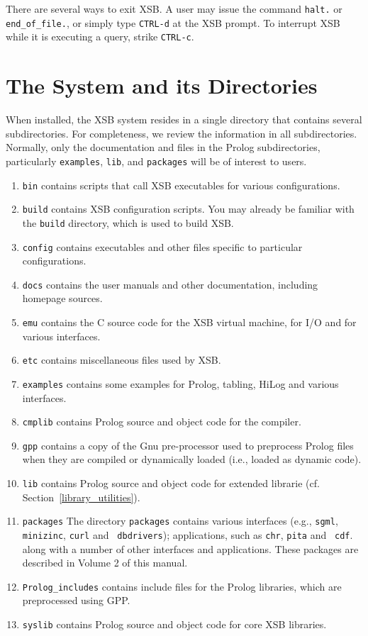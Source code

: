 There are several ways to exit XSB.  A user may issue the
command \verb'halt.' or \verb'end_of_file.', or simply type
\verb'CTRL-d' at the XSB prompt.  To interrupt XSB
while it is executing a query, strike \verb'CTRL-c'.

\section{The System and its Directories}
When installed, the XSB system resides in a single directory that
contains several subdirectories.  For completeness, we review the
information in all subdirectories.  Normally, only the documentation
and files in the Prolog subdirectories, particularly {\tt examples},
{\tt lib}, and {\tt packages} will be of interest to users.
\begin{enumerate}
\item {\tt bin} contains scripts that call XSB executables
for various configurations.
%
\item {\tt build} contains XSB configuration scripts.  You may
already be familiar with the {\tt build} directory, which is used to
build XSB.
%
\item {\tt config} contains executables and other files specific to
particular configurations.
%
\item {\tt docs} contains the user manuals and other documentation,
including homepage sources.  
%
\item {\tt emu} contains the C source code for the XSB virtual
  machine, for I/O and for various interfaces.
%
\item {\tt etc} contains miscellaneous files used by XSB.
%
\item {\tt examples} contains some examples for Prolog, tabling,
HiLog and various interfaces.
%
\item {\tt cmplib} contains Prolog source and object code for the
compiler. 
%
\item {\tt gpp} contains a copy of the Gnu pre-processor used to
  preprocess Prolog files when they are compiled or dynamically
  loaded (i.e., loaded as dynamic code).
%
\item {\tt lib} contains Prolog source and object code for extended
librarie (cf. Section~\ref{library_utilities}). 
%
\item {\tt packages} The directory {\tt packages} contains various
  interfaces (e.g., {\tt sgml}, {\tt minizinc}, {\tt curl} and {\tt
    dbdrivers}); applications, such as {\tt chr}, {\tt pita} and {\tt
    cdf}. along with a number of other interfaces and applications.
  These packages are described in Volume 2 of this manual.
%
\item {\tt Prolog\_includes} contains include files for the Prolog
libraries, which are preprocessed using GPP.
%
\item {\tt syslib} contains Prolog source and object code for core XSB
libraries. 
\end{enumerate}

